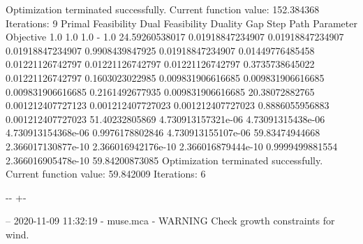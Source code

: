\documentclass[letterpaper,10pt,english]{sphinxmanual}
\newlength\nbsphinxcodecellspacing
\begin{document}
{\begin{sphinxVerbatim}[commandchars=\\\{\}]
Optimization terminated successfully.
         Current function value: 152.384368
         Iterations: 9
Primal Feasibility  Dual Feasibility    Duality Gap         Step             Path Parameter      Objective
1.0                 1.0                 1.0                 -                1.0                 24.59260538017
0.01918847234907    0.01918847234907    0.01918847234907    0.9908439847925  0.01918847234907    0.01449776485458
0.01221126742797    0.01221126742797    0.01221126742797    0.3735738645022  0.01221126742797    0.1603023022985
0.009831906616685   0.009831906616685   0.009831906616685   0.2161492677935  0.009831906616685   20.38072882765
0.001212407727123   0.001212407727023   0.001212407727023   0.8886055956883  0.001212407727023   51.40232805869
4.730913157321e-06  4.73091315438e-06   4.730913154368e-06  0.9976178802846  4.730913155107e-06  59.83474944668
2.366017130877e-10  2.366016942176e-10  2.366016879444e-10  0.9999499881554  2.366016905478e-10  59.84200873085
Optimization terminated successfully.
         Current function value: 59.842009
         Iterations: 6
\end{sphinxVerbatim}
}

{

\kern-\sphinxverbatimsmallskipamount\kern-\baselineskip
\kern+\FrameHeightAdjust\kern-\fboxrule
\vspace{\nbsphinxcodecellspacing}

\begin{sphinxVerbatim}[commandchars=\\\{\}]
-- 2020-11-09 11:32:19 - muse.mca - WARNING
Check growth constraints for wind.

\end{sphinxVerbatim}
}
\end{document}
